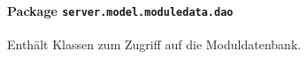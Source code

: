 \FloatBarrier
\paragraph[Package server.model.moduledata.dao]{Package \texttt{server.model.moduledata.dao}}
Enthält Klassen zum Zugriff auf die Moduldatenbank.
       